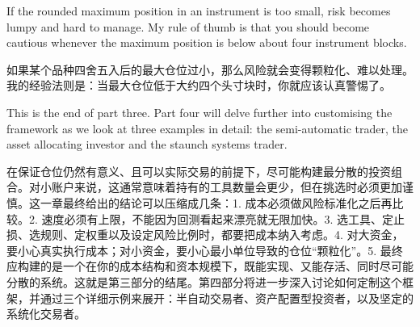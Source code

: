 \begin{englishblock} If the rounded maximum position in an instrument is too small, risk becomes lumpy and hard to manage. My rule of thumb is that you should become cautious whenever the maximum position is below about four instrument blocks. \end{englishblock}

\begin{chineseblock}如果某个品种四舍五入后的最大仓位过小，那么风险就会变得颗粒化、难以处理。我的经验法则是：当最大仓位低于大约四个头寸块时，你就应该认真警惕了。\end{chineseblock}


\begin{bilingualtableblock} 
\end{bilingualtableblock}

\begin{englishblock} This is the end of part three. Part four will delve further into customising the framework as we look at three examples in detail: the semi-automatic trader, the asset allocating investor and the staunch systems trader. \end{englishblock}

\begin{chineseblock}在保证仓位仍然有意义、且可以实际交易的前提下，尽可能构建最分散的投资组合。对小账户来说，这通常意味着持有的工具数量会更少，但在挑选时必须更加谨慎。这一章最终给出的结论可以压缩成几条：1. 成本必须做风险标准化之后再比较。2. 速度必须有上限，不能因为回测看起来漂亮就无限加快。3. 选工具、定止损、选规则、定权重以及设定风险比例时，都要把成本纳入考虑。4. 对大资金，要小心真实执行成本；对小资金，要小心最小单位导致的仓位“颗粒化”。5. 最终应构建的是一个在你的成本结构和资本规模下，既能实现、又能存活、同时尽可能分散的系统。这就是第三部分的结尾。第四部分将进一步深入讨论如何定制这个框架，并通过三个详细示例来展开：半自动交易者、资产配置型投资者，以及坚定的系统化交易者。\end{chineseblock}
